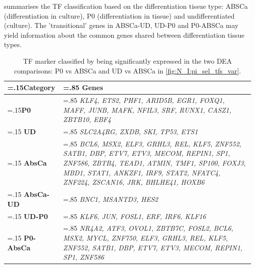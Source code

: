  summarises the TF classification based on the differentiation tissue type: ABSCa (differentiation in culture), P0 (differentiation in tissue) and undifferentiated (culture). The 'transitional' genes in ABSCa-UD, UD-P0 and P0-ABSCa may yield information about the common genes shared between differentiation tissue types.

\begin{table}[!htb]
  \centering
  \small
  \begin{tabularx}{\textwidth}{>{\hsize=.15\hsize}X|>{\hsize=.85\hsize}X}
    \toprule
    \textbf{Category} & \textbf{Genes} \\
    \midrule
    \textbf{P0} & \textit{KLF4, ETS2, PHF1, ARID5B, EGR1, FOXQ1, MAFF, JUNB, MAFK, NFIL3, SRF, RUNX1, CASZ1, ZBTB10, EBF4} \\
    \midrule
    \textbf{UD} & \textit{SLC2A4RG, ZXDB, SKI, TP53, ETS1} \\
    \midrule
    \textbf{AbsCa} & \textit{BCL6, MSX2, ELF3, GRHL3, REL, KLF5, ZNF552, SATB1, DBP, ETV7, ETV3, MECOM, REPIN1, SP1, ZNF586, ZBTB4, TEAD1, ATMIN, TMF1, SP100, FOXJ3, MBD1, STAT1, ANKZF1, IRF9, STAT2, NFATC4, ZNF224, ZSCAN16, JRK, BHLHE41, HOXB6} \\
    \midrule
    \textbf{AbsCa-UD} & \textit{BNC1, MSANTD3, HES2} \\
    \midrule
    \textbf{UD-P0} & \textit{KLF6, JUN, FOSL1, ERF, IRF6, KLF16} \\
    \midrule
    \textbf{P0-AbsCa} & \textit{NR4A2, ATF3, OVOL1, ZBTB7C, FOSL2, BCL6, MSX2, MYCL, ZNF750, ELF3, GRHL3, REL, KLF5, ZNF552, SATB1, DBP, ETV7, ETV3, MECOM, REPIN1, SP1, ZNF586} \\
    \bottomrule
  \end{tabularx}
  \caption[Tissue differentiation markers]{TF marker classified by being significantly expressed in the two DEA comparisons: P0 vs ABSCa and UD vs ABSCa in \cref{fig:N_I:pi_sel_tfs_var}.} 
  \label{tab:N_I:markers_diff}
\end{table}

